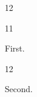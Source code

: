 \documentclass[paper=A4]{ropas-poster}
\begin{document}
\begin{postergrid}{1}{2}
\begin{posterblock}{1}{1}
\begin{theorem}First.\end{theorem}
\end{posterblock}
\begin{posterblock}{1}{2}
\begin{definition}Second.\end{definition}
\end{posterblock}
\end{postergrid}
\end{document}
